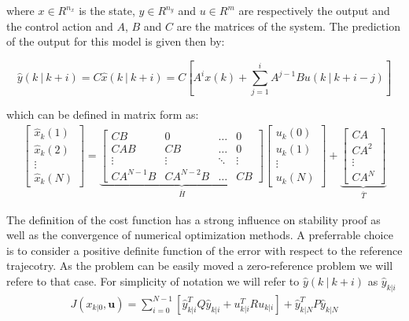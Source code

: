 where $x \in R^{n_x}$ is the state, $y \in R^{n_y}$ and $u \in R^m$ are respectively the output and the control action and $A$, $B$ and $C$ are the matrices of the system. The prediction of the output for this model is given then by:

\begin{equation}\label{system_prediction}
	\hat{y}(k\ |\ k+i)=C\hat{x}(k\ |\ k+i)=C\left[A^i x(k) + \sum_{j=1}^{i} A^{j-1}Bu(k\ |\ k+i-j)\right]
\end{equation}

which can be defined in matrix form as: 
\begin{equation}
\begin{split}
	\left[ \begin{matrix} \hat{x}_k(1) \\ \hat{x}_k(2) \\ \vdots \\ \hat{x}_k(N) \end{matrix} \right] = \underbrace{\left[ \begin{matrix}
	CB		 & 	0	    &	\dots	&	0 		\\
	CAB		 & 	CB	    &	\dots	&	0 		\\
	\vdots	 &  \vdots  &	\ddots	&	\vdots	\\
	CA^{N-1}B & CA^{N-2}B &   \dots   &	CB			
	\end{matrix}\right]}_{\bar{H}}\left[ \begin{matrix} u_k(0) \\ u_k(1) \\ \vdots \\ u_k(N) \end{matrix} \right]+ \underbrace{\left[ \begin{matrix} CA \\ CA^2 \\ \vdots \\ CA^N \end{matrix} \right]}_{\bar{T}}
	\end{split}	
\end{equation}

The definition of the cost function has a strong influence on stability proof as well as the convergence of numerical optimization methods. A preferrable choice is to consider a positive definite function of the error with respect to the reference trajecotry. As the problem can be easily moved a zero-reference problem we will refere to that case. For simplicity of notation we will refer to $\hat{y}(k\ |\ k+i)$ as $\hat{y}_{k|i}$
\begin{equation}
	\begin{split}
		J(x_{k|0},\textbf{u}) = \sum_{i=0}^{N-1} \left[\hat{y}_{k|i}^T Q \hat{y}_{k|i} + u_{k|i}^TRu_{k|i} \right] + \hat{y}_{k|N}^T P \hat{y}_{k|N}
	\end{split}	
\end{equation}

